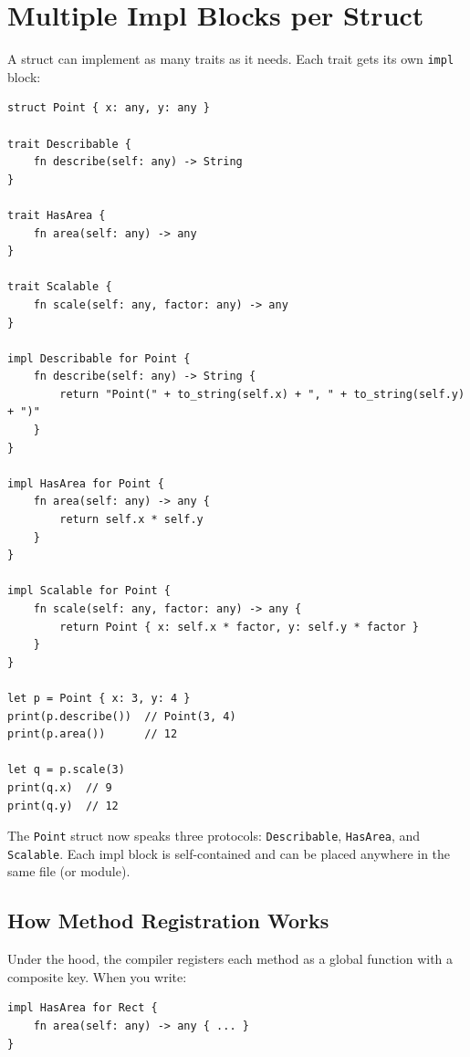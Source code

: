 \section{Multiple Impl Blocks per Struct}\label{sec:trait-multiple-impl}

A struct can implement as many traits as it needs. Each trait gets its
own \lstinline|impl| block:

\begin{lstlisting}[language=Lattice, caption={Three traits on one struct}]
struct Point { x: any, y: any }

trait Describable {
    fn describe(self: any) -> String
}

trait HasArea {
    fn area(self: any) -> any
}

trait Scalable {
    fn scale(self: any, factor: any) -> any
}

impl Describable for Point {
    fn describe(self: any) -> String {
        return "Point(" + to_string(self.x) + ", " + to_string(self.y) + ")"
    }
}

impl HasArea for Point {
    fn area(self: any) -> any {
        return self.x * self.y
    }
}

impl Scalable for Point {
    fn scale(self: any, factor: any) -> any {
        return Point { x: self.x * factor, y: self.y * factor }
    }
}

let p = Point { x: 3, y: 4 }
print(p.describe())  // Point(3, 4)
print(p.area())      // 12

let q = p.scale(3)
print(q.x)  // 9
print(q.y)  // 12
\end{lstlisting}

The \lstinline|Point| struct now speaks three protocols:
\lstinline|Describable|, \lstinline|HasArea|, and \lstinline|Scalable|. Each
impl block is self-contained and can be placed anywhere in the same file
(or module).

\subsection{How Method Registration Works}

Under the hood, the compiler registers each method as a global function
with a composite key. When you write:

\begin{lstlisting}[language=Lattice]
impl HasArea for Rect {
    fn area(self: any) -> any { ... }
}
\end{lstlisting}

